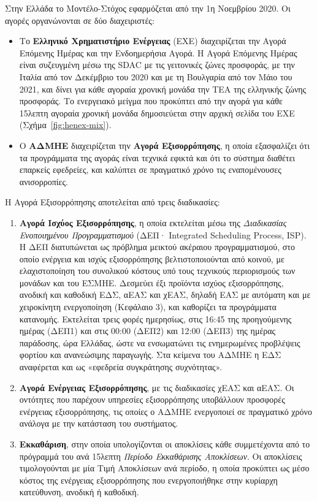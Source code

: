 Στην Ελλάδα το Μοντέλο-Στόχος εφαρμόζεται από την 1η Νοεμβρίου 2020. Οι αγορές οργανώνονται
σε δύο διαχειριστές:

\begin{itemize}
\item Το \textbf{Ελληνικό Χρηματιστήριο Ενέργειας} (ΕΧΕ) διαχειρίζεται την Αγορά Επόμενης
      Ημέρας και την Ενδοημερήσια Αγορά. Η Αγορά Επόμενης Ημέρας είναι συζευγμένη μέσω της
      SDAC με τις γειτονικές ζώνες προσφοράς, με την Ιταλία από τον Δεκέμβριο του 2020 και με
      τη Βουλγαρία από τον Μάιο του 2021, και δίνει για κάθε αγοραία χρονική μονάδα την ΤΕΑ της
      ελληνικής ζώνης προσφοράς. Το ενεργειακό μείγμα που προκύπτει από την αγορά για κάθε
      15λεπτη αγοραία χρονική μονάδα δημοσιεύεται στην αρχική σελίδα του ΕΧΕ
      (Σχήμα~\ref{fig:henex-mix}).
\item Ο \textbf{ΑΔΜΗΕ} διαχειρίζεται την \textbf{Αγορά Εξισορρόπησης}, η οποία εξασφαλίζει ότι
      τα προγράμματα της αγοράς είναι τεχνικά εφικτά και ότι το σύστημα διαθέτει επαρκείς
      εφεδρείες, και καλύπτει σε πραγματικό χρόνο τις εναπομένουσες ανισορροπίες.
\end{itemize}



Η Αγορά Εξισορρόπησης αποτελείται από τρεις διαδικασίες:

\begin{enumerate}
\item \textbf{Αγορά Ισχύος Εξισορρόπησης}, η οποία εκτελείται μέσω της \emph{Διαδικασίας
      Ενοποιημένου Προγραμματισμού} (ΔΕΠ· Integrated Scheduling Process, ISP). Η ΔΕΠ
      διατυπώνεται ως πρόβλημα μεικτού ακέραιου προγραμματισμού, στο οποίο ενέργεια και ισχύς
      εξισορρόπησης βελτιστοποιούνται από κοινού, με ελαχιστοποίηση του συνολικού κόστους υπό
      τους τεχνικούς περιορισμούς των μονάδων και του ΕΣΜΗΕ. Δεσμεύει έξι προϊόντα ισχύος
      εξισορρόπησης, ανοδική και καθοδική ΕΔΣ, αΕΑΣ και χΕΑΣ, δηλαδή ΕΑΣ με αυτόματη και με
      χειροκίνητη ενεργοποίηση (Κεφάλαιο 3), και καθορίζει τα προγράμματα κατανομής.
      Εκτελείται τρεις φορές ημερησίως, στις 16:45 της προηγούμενης ημέρας (ΔΕΠ1)
      και στις 00:00 (ΔΕΠ2) και 12:00 (ΔΕΠ3) της ημέρας παράδοσης, ώρα Ελλάδας, ώστε να
      ενσωματώνει τις ενημερωμένες προβλέψεις φορτίου και ανανεώσιμης παραγωγής. Στα κείμενα
      του ΑΔΜΗΕ η ΕΔΣ αναφέρεται και ως «εφεδρεία συγκράτησης συχνότητας».
\item \textbf{Αγορά Ενέργειας Εξισορρόπησης}, με τις διαδικασίες χΕΑΣ και αΕΑΣ. Οι οντότητες
      που παρέχουν υπηρεσίες εξισορρόπησης υποβάλλουν προσφορές ενέργειας εξισορρόπησης, τις
      οποίες ο ΑΔΜΗΕ ενεργοποιεί σε πραγματικό χρόνο ανάλογα με την κατάσταση του συστήματος.
\item \textbf{Εκκαθάριση}, στην οποία υπολογίζονται οι αποκλίσεις κάθε συμμετέχοντα από το
      πρόγραμμά του ανά 15λεπτη \emph{Περίοδο Εκκαθάρισης Αποκλίσεων}. Οι αποκλίσεις
      τιμολογούνται με μία Τιμή Αποκλίσεων ανά περίοδο, η οποία προκύπτει ως μέσο κόστος της
      ενέργειας εξισορρόπησης που ενεργοποιήθηκε στην κυρίαρχη κατεύθυνση, ανοδική ή καθοδική.
\end{enumerate}

